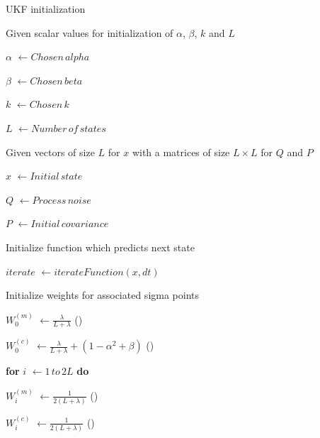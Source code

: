 \documentclass[../Head/report.tex]{subfiles}
\begin{document}
\begin{Pseudo}{UKF initialization}{}
\begin{Indentation}
	\item Given scalar values for initialization of $\alpha$, $\beta$, $k$ and $L$
	\item $\alpha$ \( \leftarrow Chosen\, alpha \)
	\item $\beta$ \( \leftarrow Chosen\, beta \)
	\item $k$ \( \leftarrow Chosen\, k \)
	\item $L$ \( \leftarrow Number\, of\, states \)
	\item Given vectors of size $L$ for $x$ with a matrices of size $L \times L$ for $Q$ and  $P$ 
	\item $x$ \( \leftarrow Initial\, state\)
	\item $Q$ \( \leftarrow Process\, noise \)
	\item $P$ \( \leftarrow Initial\, covariance \)
	\item Initialize function which predicts next state
	\item $iterate$ \( \leftarrow iterateFunction(x,dt) \)
	\item Initialize weights for associated sigma points 
	\item $W^{(m)}_0$ \( \leftarrow \frac{\lambda}{L+\lambda} \)  \qquad {}(\theequation)\label{eq:init_weight_zero_mean}
	\item $W^{(c)}_0$ \( \leftarrow \frac{\lambda}{L+\lambda} + (1-\alpha^2 +\beta)	\)  \qquad {}(\theequation)\label{eq:init_weight_zero_covariance}

    \item \textbf{for} $i$ \(\leftarrow 1\, to\, 2L\) \textbf{do}
        \begin{Indentation}
            \item $W^{(m)}_i$ \(\leftarrow \frac{1}{2(L+\lambda)} \) \qquad {}(\theequation)\label{eq:init_weight_ith_mean}
            \item $W^{(c)}_i$ \(\leftarrow \frac{1}{2(L+\lambda)} \) \qquad {}(\theequation)\label{eq:init_weight_ith_covariance} \vspace{-5pt}
    \end{Indentation}
\end{Indentation}
\end{Pseudo}
\end{document}
